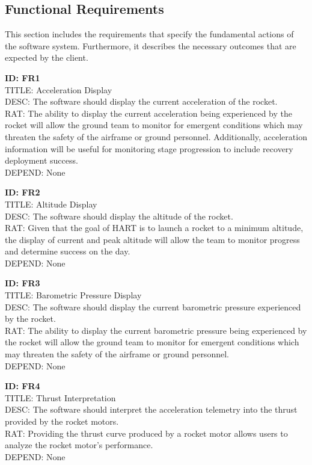 \documentclass[onecolumn, draftclsnofoot,10pt, compsoc]{IEEEtran}
\begin{document}
		\subsection{Functional Requirements}
			This section includes the requirements that specify the fundamental actions of the software system. Furthermore, it describes the necessary outcomes that are expected by the client.

			\noindent
			\textbf{ID: FR1}\\
			TITLE: Acceleration Display\\
			DESC: The software should display the current acceleration of the rocket.\\
			RAT: The ability to display the current acceleration being experienced by the rocket will allow the ground team to monitor for emergent conditions which may threaten the safety of the airframe or ground personnel.
				Additionally, acceleration information will be useful for monitoring stage progression to include recovery deployment success.\\
			DEPEND: None
			
			\noindent
			\textbf{ID: FR2}\\
			TITLE: Altitude Display\\
			DESC: The software should display the altitude of the rocket.\\
			RAT: Given that the goal of HART is to launch a rocket to a minimum altitude, the display of current and peak altitude will allow the team to monitor progress and determine success on the day.\\
			DEPEND: None\
			
			\noindent
			\textbf{ID: FR3}\\
			TITLE: Barometric Pressure Display\\
			DESC: The software should display the current barometric pressure experienced by the rocket.\\
			RAT: The ability to display the current barometric pressure being experienced by the rocket will allow the ground team to monitor for emergent conditions which may threaten the safety of the airframe or ground personnel.\\
			DEPEND: None
			
			\noindent
			\textbf{ID: FR4}\\
			TITLE: Thrust Interpretation\\
			DESC: The software should interpret the acceleration telemetry into the thrust provided by the rocket motors.\\
			RAT: Providing the thrust curve produced by a rocket motor allows users to analyze the rocket motor's performance.\\
			DEPEND: None
			
\end{document}

